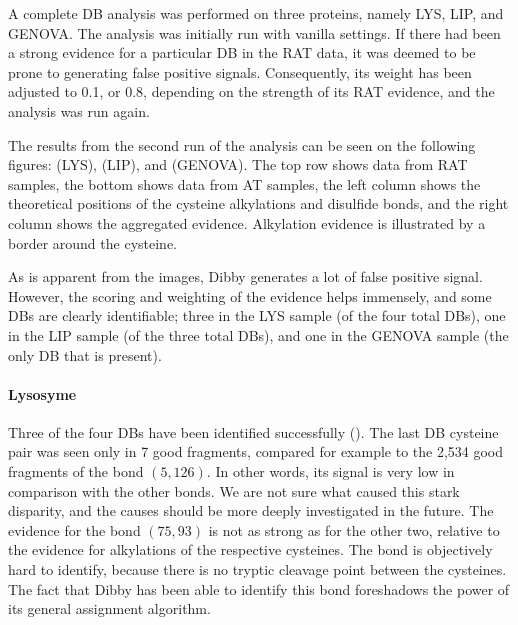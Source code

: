 A complete DB analysis was performed on three proteins, namely LYS, LIP, and GENOVA\@. The analysis was initially run with vanilla settings. If there had been a strong evidence for a particular DB in the RAT data, it was deemed to be prone to generating false positive signals. Consequently, its weight has been adjusted to 0.1, or 0.8, depending on the strength of its RAT evidence, and the analysis was run again.

The results from the second run of the analysis can be seen on the following figures:  (LYS),  (LIP), and  (GENOVA). The top row shows data from RAT samples, the bottom shows data from AT samples, the left column shows the theoretical positions of the cysteine alkylations and disulfide bonds, and the right column shows the aggregated evidence. Alkylation evidence is illustrated by a border around the cysteine.

As is apparent from the images, Dibby generates a lot of false positive signal. However, the scoring and weighting of the evidence helps immensely, and some DBs are clearly identifiable; three in the LYS sample (of the four total DBs), one in the LIP sample (of the three total DBs), and one in the GENOVA sample (the only DB that is present).


\paragraph{Lysosyme} Three of the four DBs have been identified successfully (). The last DB cysteine pair was seen only in 7 good fragments, compared for example to the 2,534 good fragments of the bond \((5, 126)\). In other words, its signal is very low in comparison with the other bonds. We are not sure what caused this stark disparity, and the causes should be more deeply investigated in the future. The evidence for the bond \((75, 93)\) is not as strong as for the other two, relative to the evidence for alkylations of the respective cysteines. The bond is objectively hard to identify, because there is no tryptic cleavage point between the cysteines. The fact that Dibby has been able to identify this bond foreshadows the power of its general assignment algorithm.

